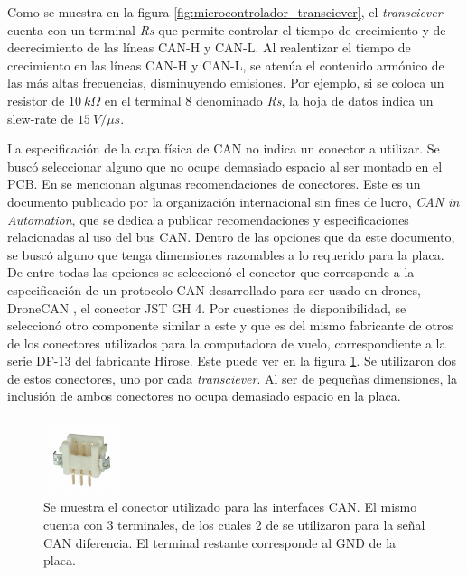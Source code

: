 Como se muestra en la figura \ref{fig:microcontrolador_transciever}, el \textit{transciever} cuenta con un terminal \textit{Rs} que permite controlar el tiempo de crecimiento y de decrecimiento de las líneas CAN-H y CAN-L. Al realentizar el tiempo de crecimiento en las líneas CAN-H y CAN-L, se atenúa el contenido armónico de las más altas frecuencias, disminuyendo emisiones. Por ejemplo, si se coloca un resistor de $10 \ k\Omega$ en el terminal 8 denominado \textit{Rs}, la hoja de datos indica un slew-rate de $15 \ V / \mu s$.

La especificación de la capa física de CAN no indica un conector a utilizar. Se buscó seleccionar alguno que no ocupe demasiado espacio al ser montado en el PCB. En \cite{CiAconnector} se mencionan algunas recomendaciones de conectores. Este es un documento publicado por la organización internacional sin fines de lucro, \textit{CAN in Automation}, que se dedica a publicar recomendaciones y especificaciones relacionadas al uso del bus CAN. Dentro de las opciones que da este documento, se buscó alguno que tenga dimensiones razonables a lo requerido para la placa. De entre todas las opciones se seleccionó el conector que corresponde a la especificación de un protocolo CAN desarrollado para ser usado en drones, DroneCAN \cite{DroneCAN}, el conector JST GH 4. Por cuestiones de disponibilidad, se seleccionó otro componente similar a este y que es del mismo fabricante de otros de los conectores utilizados para la computadora de vuelo, correspondiente a la serie DF-13 del fabricante Hirose. Este puede ver en la figura \ref{fig:conector_CAN}. Se utilizaron dos de estos conectores, uno por cada \textit{transciever}. Al ser de pequeñas dimensiones, la inclusión de ambos conectores no ocupa demasiado espacio en la placa.


\begin{figure}[H]
    \centering
    \includegraphics[width=0.2\textwidth]{img/conector_CAN.jpg}    
    \caption{Se muestra el conector utilizado para las interfaces CAN. El mismo cuenta con 3 terminales, de los cuales 2 de se utilizaron para la señal CAN diferencia. El terminal restante corresponde al GND de la placa.}
    \label{fig:conector_CAN}
\end{figure}


